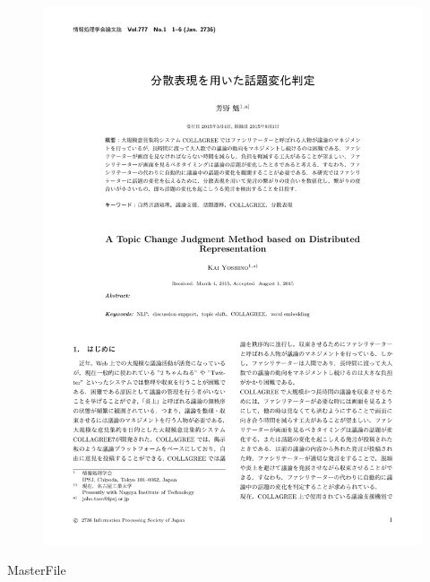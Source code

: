 \begin{figure}
	\centering
	\includegraphics[width=\linewidth,page=6]{../C.IPSJ80/jsample-submit.pdf}
\end{figure}

\clearpage
\expandafter\ifx\csname MasterFile\endcsname\relax

\fi
